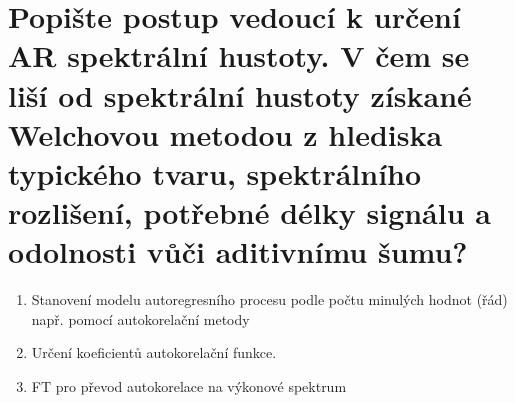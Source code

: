 \documentclass[a4paper,12pt]{article}   %
\begin{document}
\section{Popište postup vedoucí k určení AR spektrální hustoty. V čem se liší od spektrální hustoty získané Welchovou metodou z hlediska typického tvaru, spektrálního rozlišení, potřebné délky signálu a odolnosti vůči aditivnímu šumu?}
\begin{enumerate}
        \item Stanovení modelu autoregresního procesu podle počtu minulých hodnot (řád) např. pomocí autokorelační metody
        \item Určení koeficientů autokorelační funkce.
        \item FT pro převod autokorelace na výkonové spektrum
\end{enumerate}
\end{document}
